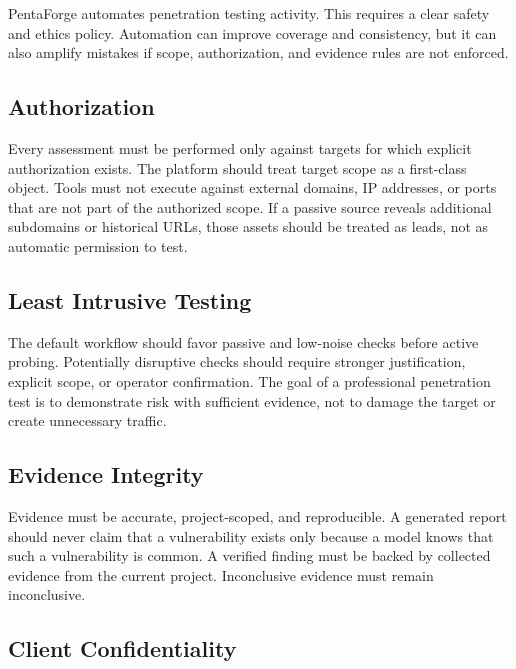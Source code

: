 \documentclass[12pt,a4paper]{report}
\begin{document}
PentaForge automates penetration testing activity. This requires a clear safety and
ethics policy. Automation can improve coverage and consistency, but it can also amplify
mistakes if scope, authorization, and evidence rules are not enforced.

\subsection*{Authorization}

Every assessment must be performed only against targets for which explicit
authorization exists. The platform should treat target scope as a first-class object.
Tools must not execute against external domains, IP addresses, or ports that are not
part of the authorized scope. If a passive source reveals additional subdomains or
historical URLs, those assets should be treated as leads, not as automatic permission
to test.

\subsection*{Least Intrusive Testing}

The default workflow should favor passive and low-noise checks before active probing.
Potentially disruptive checks should require stronger justification, explicit scope,
or operator confirmation. The goal of a professional penetration test is to demonstrate
risk with sufficient evidence, not to damage the target or create unnecessary traffic.

\subsection*{Evidence Integrity}

Evidence must be accurate, project-scoped, and reproducible. A generated report should
never claim that a vulnerability exists only because a model knows that such a
vulnerability is common. A verified finding must be backed by collected evidence from
the current project. Inconclusive evidence must remain inconclusive.

\subsection*{Client Confidentiality}
\end{document}
